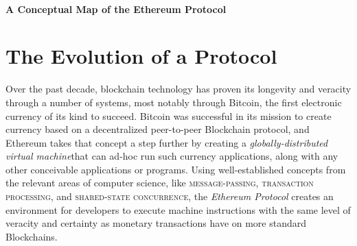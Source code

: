 \documentclass[11pt,a4paper,leqno,bibliography=totoc]{scrartcl}
\newenvironment{alphafootnotes}
{\par\edef\savedfootnotenumber{\number\value{footnote}}
\renewcommand{\thefootnote}{\alph{footnote}}
\setcounter{footnote}{0}}
{\par\setcounter{footnote}{\savedfootnotenumber}}
\begin{document}
\begin{alphafootnotes}
\begin{multicols*}{2}
	\paragraph{A Conceptual Map of the Ethereum Protocol}
\begin{savenotes}
\end{savenotes}


\section{The Evolution of a Protocol}
	Over the past decade, blockchain technology has proven its longevity and veracity through a number of systems, most notably through Bitcoin, the first electronic currency of its kind to succeed. Bitcoin was successful in its mission to create currency based on a decentralized peer-to-peer Blockchain protocol, and Ethereum takes that concept a step further by creating a \textit{globally-distributed virtual machine}that can ad-hoc run such currency applications, along with any other conceivable applications or programs. Using well-established concepts from the relevant areas of computer science, like \textsc{message-passing}, \textsc{transaction processing}, and \textsc{shared-state concurrence}, the \textsl{Ethereum Protocol} creates an environment for developers to execute machine instructions with the same level of veracity and certainty as monetary transactions have on more standard Blockchains.  


\end{multicols*}
\end{alphafootnotes}
\end{document}
